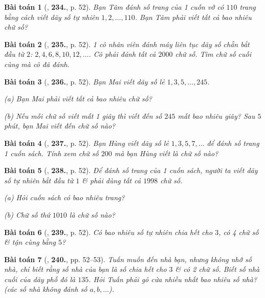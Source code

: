 \documentclass{article}
\numberwithin{equation}{section}
\newtheorem{baitoan}{Bài toán}[section]
\begin{document}
\begin{baitoan}[\cite{Binh_Toan_6_tap_1}, \textbf{234.}, p. 52]
	Bạn Tâm đánh số trang của 1 cuốn vở có $110$ trang bằng cách viết dãy số tự nhiên $1,2,\ldots,110$. Bạn Tâm phải viết tất cả bao nhiêu chữ số?
\end{baitoan}

\begin{baitoan}[\cite{Binh_Toan_6_tap_1}, \textbf{235.}, p. 52]
	1 cô nhân viên đánh máy liên tục dãy số chẵn bắt đầu từ $2$: $2,4,6,8,10,12,\ldots$. Cô phải đánh tất cả $2000$ chữ số. Tìm chữ số cuối cùng mà cô đã đánh.
\end{baitoan}

\begin{baitoan}[\cite{Binh_Toan_6_tap_1}, \textbf{236.}, p. 52]
	Bạn Mai viết dãy số lẻ $1,3,5,\ldots,245$.
	\begin{enumerate*}
		\item[(a)] Bạn Mai phải viết tất cả bao nhiêu chữ số?
		\item[(b)] Nếu mỗi chữ số viết mất 1 giây thì viết đến số $245$ mất bao nhiêu giây? Sau $5$ phút, bạn Mai viết đến chữ số nào?
	\end{enumerate*}
\end{baitoan}

\begin{baitoan}[\cite{Binh_Toan_6_tap_1}, \textbf{237.}, p. 52]
	Bạn Hùng viết dãy số lẻ $1,3,5,7,\ldots$ để đánh số trang 1 cuốn sách. Tính xem chữ số $200$ mà bạn Hùng viết là chữ số nào?
\end{baitoan}

\begin{baitoan}[\cite{Binh_Toan_6_tap_1}, \textbf{238.}, p. 52]
	Để đánh số trang của 1 cuốn sách, người ta viết dãy số tự nhiên bắt đầu từ $1$ \& phải dùng tất cả $1998$ chữ số.
	\begin{enumerate*}
		\item[(a)] Hỏi cuốn sách có bao nhiêu trang?
		\item[(b)] Chữ số thứ $1010$ là chữ số nào?
	\end{enumerate*}
\end{baitoan}

\begin{baitoan}[\cite{Binh_Toan_6_tap_1}, \textbf{239.}, p. 52]
	Có bao nhiêu số tự nhiên chia hết cho $3$, có 4 chữ số \& tận cùng bằng $5$?
\end{baitoan}

\begin{baitoan}[\cite{Binh_Toan_6_tap_1}, \textbf{240.}, pp. 52--53]
	Tuấn muốn đến nhà bạn, nhưng không nhớ số nhà, chỉ biết rằng số nhà của bạn là số chia hết cho $3$ \& có 2 chữ số. Biết số nhà cuối của dãy phố đó là $135$. Hỏi Tuấn phải gõ cửa nhiều nhất bao nhiêu số nhà? (các số nhà không đánh số $a,b,\ldots$).
\end{baitoan}
\end{document}
